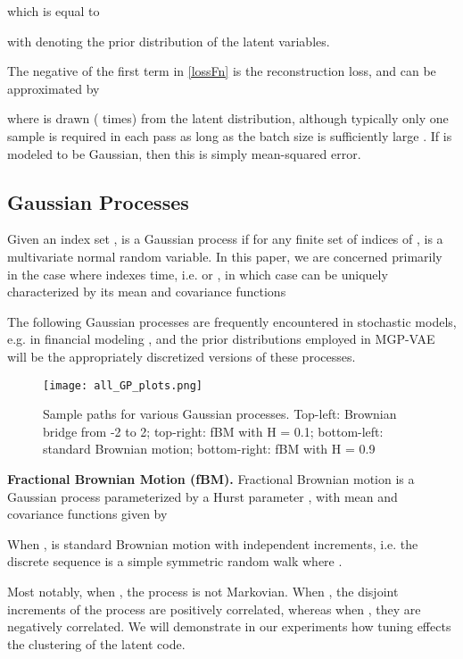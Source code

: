 \documentclass[runningheads]{llncs}
\begin{document}
   which is equal to
   
   with  denoting the prior distribution of the latent variables. \par 

   The negative of the first term in \eqref{lossFn} is the reconstruction loss, and can be approximated by
      
   where  is drawn ( times) from the latent distribution, although typically only one sample is required in each pass as long as the batch size is sufficiently large \cite{Kingma2013AutoEncodingVB}. If  is modeled to be Gaussian, then this is simply mean-squared error.
         
   \subsection{Gaussian Processes}
   Given an index set ,  is a Gaussian process \cite{hidaGP,williams2006gaussian} if for any finite set of indices  of ,  is a multivariate normal random variable. In this paper, we are concerned primarily in the case where  indexes time, i.e.  or , in which case  can be uniquely characterized by its mean and covariance functions
   
   
   The following Gaussian processes are frequently encountered in stochastic models, e.g. in financial modeling \cite{bfg2016,glasserman}, and the prior distributions employed in MGP-VAE will be the appropriately discretized versions of these processes.

    \begin{figure}
   \centering  
   \texttt{[image: all\_GP\_plots.png]}
   \caption{Sample paths for various Gaussian processes. Top-left: Brownian bridge from -2 to 2; top-right: fBM with H = 0.1; bottom-left: standard Brownian motion; bottom-right: fBM with H = 0.9}
   \end{figure}

\noindent \textbf{Fractional Brownian Motion (fBM). }
   Fractional Brownian motion \cite{fBMMandelbrot}  is a Gaussian process parameterized by a Hurst parameter , with mean and covariance functions given by
   
   When ,  is standard Brownian motion \cite{hidaGP} with independent increments, i.e. the discrete sequence  is a simple symmetric random walk where . \par 
   Most notably, when , the process is not Markovian. When , the disjoint increments of the process are positively correlated, whereas when , they are negatively correlated. We will demonstrate in our experiments how tuning  effects the clustering of the latent code. \par
   
\end{document}
